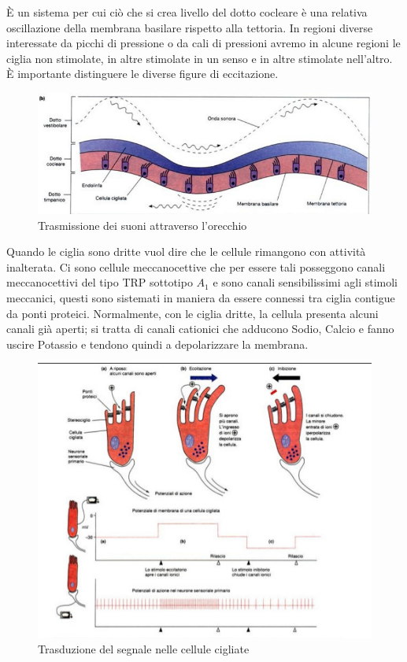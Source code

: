 \documentclass[a4paper,12pt]{article}
\begin{document}
È un sistema per cui ciò che si crea livello del dotto cocleare è una relativa oscillazione della membrana basilare rispetto alla tettoria. In regioni diverse interessate da picchi di pressione o da cali di pressioni avremo in alcune regioni le ciglia non stimolate, in altre stimolate in un senso e in altre stimolate nell'altro. È importante distinguere le diverse figure di eccitazione. 
\begin{figure}[H]
\centering
\includegraphics[scale=0.45]{immagine/onda.jpg}
\caption{Trasmissione dei suoni attraverso l'orecchio}
\end{figure} 

Quando le ciglia sono dritte vuol dire che le cellule rimangono con attività inalterata. 
Ci sono cellule meccanocettive che per essere tali posseggono canali meccanocettivi del tipo TRP sottotipo $A_{1}$ e sono canali sensibilissimi agli stimoli meccanici, questi sono sistemati in maniera da essere connessi tra ciglia contigue da ponti proteici. Normalmente, con le ciglia dritte, la cellula presenta alcuni canali già aperti; si tratta di canali cationici che adducono Sodio, Calcio e fanno uscire Potassio e tendono quindi a depolarizzare la membrana. 

\begin{figure}[H]
\centering
\includegraphics[scale=0.6]{immagine/ciglia.jpg}
\caption{Trasduzione del segnale nelle cellule cigliate}
\end{figure} 
\end{document}
